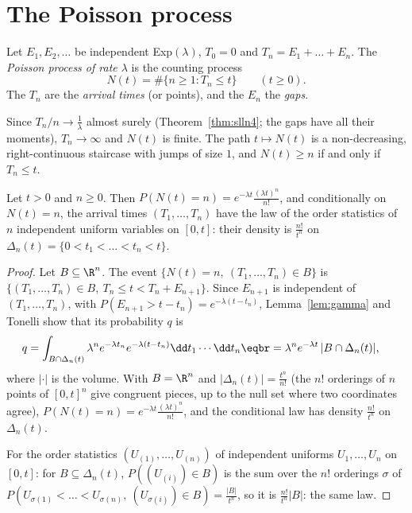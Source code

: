 \section{The Poisson process}

\begin{definition}\label{def:pp}
Let $E_1,E_2,\ldots$ be independent Exp$(\lambda)$, $T_0=0$ and $T_n=E_1+\dots+E_n$. The \emph{Poisson process of rate $\lambda$} is the counting process
\[
N(t)=\#\{n\ge1:T_n\le t\}\qquad(t\ge0).
\]
The $T_n$ are the \emph{arrival times} (or points), and the $E_n$ the \emph{gaps}.
\end{definition}

Since $T_n/n\to\frac1\lambda$ almost surely (Theorem~\ref{thm:slln4}; the gaps have all their moments), $T_n\to\infty$ and $N(t)$ is finite. The path
$t\mapsto N(t)$ is a non-decreasing, right-continuous staircase with jumps of size $1$, and $N(t)\ge n$ if and only if $T_n\le t$.

\begin{theorem}\label{thm:uniform}
Let $t>0$ and $n\ge0$. Then $P(N(t)=n)=e^{-\lambda t}\frac{(\lambda t)^n}{n!}$, and conditionally on $N(t)=n$, the arrival times $(T_1,\dots,T_n)$ have the law of the
order statistics of $n$ independent uniform variables on $[0,t]$: their density is $\frac{n!}{t^n}$ on $\Delta_n(t)=\{0<t_1<\dots<t_n<t\}$.
\end{theorem}
\begin{proof}
Let $B\subseteq\R^n$. The event $\{N(t)=n,\ (T_1,\dots,T_n)\in B\}$ is $\{(T_1,\dots,T_n)\in B,\ T_n\le t<T_n+E_{n+1}\}$. Since $E_{n+1}$ is independent of $(T_1,\dots,T_n)$, with
$P(E_{n+1}>t-t_n)=e^{-\lambda(t-t_n)}$, Lemma~\ref{lem:gamma} and Tonelli show that its probability $q$ is
\[
\begin{aligned}q&=\int_{B\cap\Delta_n(t)}\lambda^ne^{-\lambda t_n}e^{-\lambda(t-t_n)}\dd t_1\cdots\dd t_n\eqbr=\lambda^ne^{-\lambda t}\,|B\cap\Delta_n(t)|,\end{aligned}
\]
where $|\cdot|$ is the volume. With $B=\R^n$ and $|\Delta_n(t)|=\frac{t^n}{n!}$ (the $n!$ orderings of $n$ points of $[0,t]^n$ give congruent pieces, up to the null set where
two coordinates agree), $P(N(t)=n)=e^{-\lambda t}\frac{(\lambda t)^n}{n!}$, and the conditional law has density $\frac{n!}{t^n}$ on $\Delta_n(t)$.

For the order statistics $(U_{(1)},\dots,U_{(n)})$ of independent uniforms $U_1,\dots,U_n$ on $[0,t]$: for $B\subseteq\Delta_n(t)$, $P((U_{(i)})\in B)$ is the sum over the
$n!$ orderings $\sigma$ of $P(U_{\sigma(1)}<\dots<U_{\sigma(n)},\ (U_{\sigma(i)})\in B)=\frac{|B|}{t^n}$, so it is $\frac{n!}{t^n}|B|$: the same law.
\end{proof}

